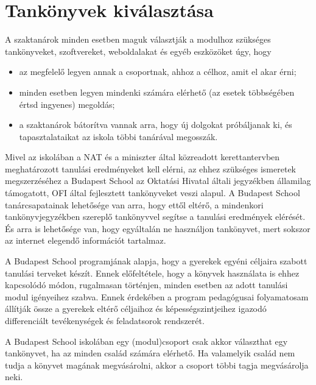 \hypertarget{tankonyvek-kivalasztasa}{%
\section{Tankönyvek kiválasztása}\label{tankonyvek-kivalasztasa}}

A szaktanárok minden esetben maguk választják a modulhoz szükséges
tankönyveket, szoftvereket, weboldalakat és egyéb eszközöket úgy, hogy

\begin{itemize}
\item
  az megfelelő legyen annak a csoportnak, ahhoz a célhoz, amit el akar
  érni;
\item
  minden esetben legyen mindenki számára elérhető (az esetek többségében
  értsd ingyenes) megoldás;
\item
  a szaktanárok bátorítva vannak arra, hogy új dolgokat próbáljanak ki,
  és tapasztalataikat az iskola többi tanárával megosszák.
\end{itemize}

Mivel az iskolában a NAT és a miniszter által közreadott kerettantervben
meghatározott tanulási eredményeket kell elérni, az ehhez szükséges
ismeretek megszerzéséhez a Budapest School az Oktatási Hivatal általi
jegyzékben államilag támogatott, OFI által fejlesztett tankönyveket
veszi alapul. A Budapest School tanárcsapatainak lehetősége van arra,
hogy ettől eltérő, a mindenkori tankönyvjegyzékben szereplő tankönyvvel
segítse a tanulási eredmények elérését. És arra is lehetősége van, hogy
egyáltalán ne használjon tankönyvet, mert sokszor az internet elegendő
információt tartalmaz.

A Budapest School programjának alapja, hogy a gyerekek egyéni céljaira
szabott tanulási terveket készít. Ennek előfeltétele, hogy a könyvek
használata is ehhez kapcsolódó módon, rugalmasan történjen, minden
esetben az adott tanulási modul igényeihez szabva. Ennek érdekében a
program pedagógusai folyamatosam állítják össze a gyerekek eltérő
céljaihoz és képességszintjeihez igazodó differenciált tevékenységek és
feladatsorok rendszerét.

A Budapest School iskolában egy (modul)csoport csak akkor választhat egy
tankönyvet, ha az minden család számára elérhető. Ha valamelyik család
nem tudja a könyvet magának megvásárolni, akkor a csoport többi tagja
megvásárolja neki.
